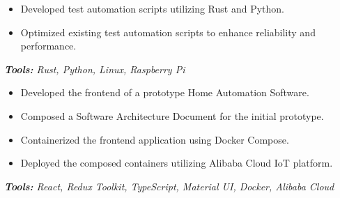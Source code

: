 \documentclass[10pt,letter]{altacv}
\begin{document}

\begin{fullwidth}
\makecvheader
\end{fullwidth}


\medskip


\begin{itemize}
  \item Developed test automation scripts utilizing Rust and Python.
  \item Optimized existing test automation scripts to enhance reliability and performance.
\end{itemize}
\textit{\textbf{Tools:} Rust, Python, Linux, Raspberry Pi}

\divider

\begin{itemize}
  \item Developed the frontend of a prototype Home Automation Software.
  \item Composed a Software Architecture Document for the initial prototype.
  \item Containerized the frontend application using Docker Compose.
  \item Deployed the composed containers utilizing Alibaba Cloud IoT platform.
\end{itemize}
\textit{\textbf{Tools:} React, Redux Toolkit, TypeScript, Material UI, Docker, Alibaba Cloud}
\end{document}
